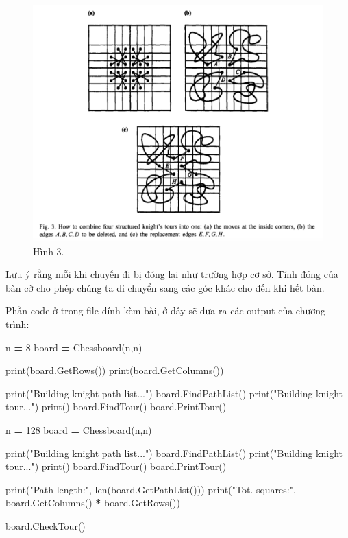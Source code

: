 \documentclass[
]{article}
\newenvironment{Shaded}{\begin{snugshade}}{\end{snugshade}}
\newcommand{\BuiltInTok}[1]{#1}
\newcommand{\DecValTok}[1]{\textcolor[rgb]{0.00,0.00,0.81}{#1}}
\newcommand{\NormalTok}[1]{#1}
\newcommand{\OperatorTok}[1]{\textcolor[rgb]{0.81,0.36,0.00}{\textbf{#1}}}
\newcommand{\StringTok}[1]{\textcolor[rgb]{0.31,0.60,0.02}{#1}}
\begin{document}
\begin{figure}
\centering
\includegraphics{Homework 5 Trial and Error 3b646dc8160042df9d000a4baa7eeb4e/Untitled 4.png}
\caption{Hình 3.}
\end{figure}

Lưu ý rằng mỗi khi chuyến đi bị đóng lại như trường hợp cơ sở. Tính đóng
của bàn cờ cho phép chúng ta di chuyển sang các góc khác cho đến khi hết
bàn.

Phần code ở trong file đính kèm bài, ở đây sẽ đưa ra các output của
chương trình:

\begin{Shaded}
\begin{Highlighting}[]
\NormalTok{n }\OperatorTok{=} \DecValTok{8}
\NormalTok{board }\OperatorTok{=}\NormalTok{ Chessboard(n,n)}

\BuiltInTok{print}\NormalTok{(board.GetRows())}
\BuiltInTok{print}\NormalTok{(board.GetColumns())}

\BuiltInTok{print}\NormalTok{(}\StringTok{"Building knight path list..."}\NormalTok{)}
\NormalTok{board.FindPathList()}
\BuiltInTok{print}\NormalTok{(}\StringTok{"Building knight tour..."}\NormalTok{)}
\BuiltInTok{print}\NormalTok{()}
\NormalTok{board.FindTour()}
\NormalTok{board.PrintTour()}

\NormalTok{n }\OperatorTok{=} \DecValTok{128}
\NormalTok{board }\OperatorTok{=}\NormalTok{ Chessboard(n,n)}

\BuiltInTok{print}\NormalTok{(}\StringTok{"Building knight path list..."}\NormalTok{)}
\NormalTok{board.FindPathList()}
\BuiltInTok{print}\NormalTok{(}\StringTok{"Building knight tour..."}\NormalTok{)}
\BuiltInTok{print}\NormalTok{()}
\NormalTok{board.FindTour()}
\NormalTok{board.PrintTour()}

\BuiltInTok{print}\NormalTok{(}\StringTok{"Path length:"}\NormalTok{, }\BuiltInTok{len}\NormalTok{(board.GetPathList()))}
\BuiltInTok{print}\NormalTok{(}\StringTok{"Tot. squares:"}\NormalTok{, board.GetColumns() }\OperatorTok{*}\NormalTok{ board.GetRows())}

\NormalTok{board.CheckTour()}
\end{Highlighting}
\end{Shaded}
\end{document}
